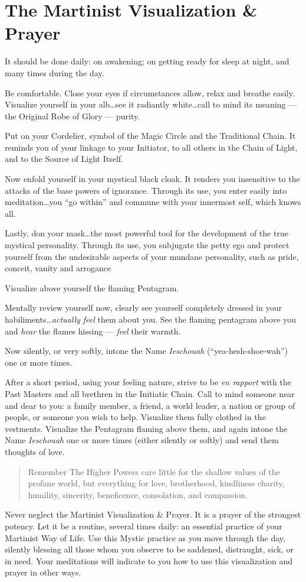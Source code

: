 \section{The Martinist Visualization \& Prayer}
It should be done daily: on awakening; on getting ready for sleep at night, and many
times during the day.

Be comfortable. Close your eyes if circumstances allow, relax and breathe easily. Visualize yourself in your alb\ldots see it radiantly white\ldots call to mind its meaning --- the Original Robe of Glory --- purity.

Put on your Cordelier, symbol of the Magic Circle and the Traditional Chain. It reminds you of your linkage to your Initiator, to all others in the Chain of Light, and to the Source of Light Itself.

Now enfold yourself in your mystical black cloak. It renders you insensitive to the attacks of the base powers of ignorance. Through its use, you enter easily into meditation\ldots you ``go within'' and commune with your innermost self, which knows all.

Lastly, don your mask\ldots the most powerful tool for the development of the true mystical personality. Through its use, you subjugate the petty ego and protect yourself from the undesirable aspects of your mundane personality, such as pride, conceit, vanity and arrogance

Visualize above yourself the flaming Pentagram.

Mentally review yourself now, clearly see yourself completely dressed in your habiliments\ldots \textit{actually feel} them about you. See the flaming pentagram above you and \textit{hear} the flames hissing --- \textit{feel} their warmth.

Now silently, or very softly, intone the Name \textit{Ieschouah} (``yea-hesh-shoe-wah'') one or more times.

After a short period, using your feeling nature, strive to be \textit{en rapport} with the Past Masters and all brethren in the Initiatic Chain. Call to mind someone near and dear to you: a family member, a friend, a world leader, a nation or group of people, or someone you wish to help. Visualize them fully clothed in the vestments. Visualize the Pentagram flaming above them, and again intone the Name \textit{Ieschouah} one or more times (either silently or softly) and send them thoughts of love.

\begin{quote}{Remember}
The Higher Powers care little for the shallow values of the profane world, but everything for love, brotherhood, kindliness charity, humility, sincerity, beneficence, consolation, and compassion.
\end{quote}

Never neglect the Martinist Visualization \& Prayer. It is a prayer of the strongest potency. Let it be a routine, several times daily: an essential practice of your Martinist Way of Life. Use this Mystic practice as you move through the day, silently blessing all those whom you observe to be saddened, distraught, sick, or in need. Your meditations will indicate to you how to use this visualization and prayer in other ways.